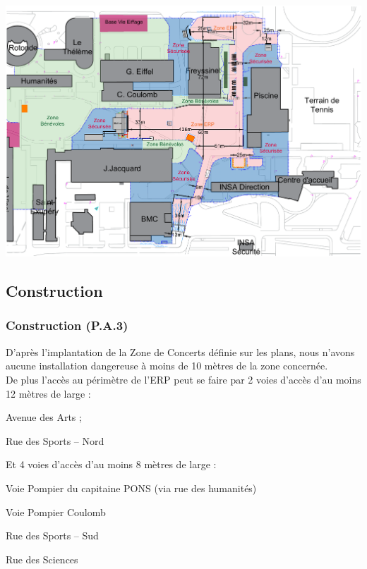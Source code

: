 \documentclass[hidelinks, paper=a4, fontsize=13pt]{report}
\begin{document}
\begin{center}
	\includegraphics[angle=90,width=.8\textwidth,keepaspectratio]{Exports/Plan_24h_44eme-Cotes}
\end{center}
\newpage
\subsection{Construction}

\subsubsection{Construction (P.A.3)} 
\label{refArticleERPContruction}
D’après l’implantation de la Zone de Concerts définie sur les plans, nous n’avons aucune installation dangereuse à moins de 10 mètres de la zone concernée. \\
De plus l’accès au périmètre de l’ERP peut se faire par 2 voies d’accès d’au moins 12 mètres de large : 
\begin{list}{•}{}
	\item Avenue des Arts ;
	\item Rue des Sports – Nord
\end{list}

Et 4 voies d’accès d’au moins 8 mètres de large : 
\begin{list}{•}{}
	\item Voie Pompier du capitaine PONS (via rue des humanités)
	\item Voie Pompier Coulomb
	\item Rue des Sports – Sud
	\item Rue des Sciences
\end{list}
\end{document}
